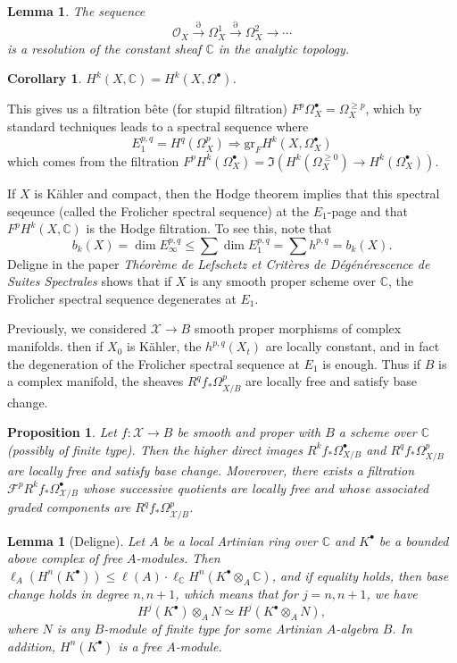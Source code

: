 \documentclass[leqno, openany]{memoir}
\newtheorem{cor}[thm]{Corollary}
\newtheorem{prop}[thm]{Proposition}
\newtheorem{lem}[thm]{Lemma}
\theoremstyle{definition}
\theoremstyle{remark}
\theoremstyle{plain}
\theoremstyle{definition}
\theoremstyle{remark}
\newcommand{\C}{\mathbb{C}}
\newcommand{\mc}[1]{\mathcal{#1}}
\newcommand{\mr}[1]{\mathrm{#1}}
\begin{document}
\begin{lem}
    The sequence
    \[ \mc{O}_X \xrightarrow{\partial} \Omega^1_{X} \xrightarrow{\partial} \Omega^2_X \to \cdots \]
    is a resolution of the constant sheaf $\C$ in the analytic topology.
\end{lem}

\begin{cor}
    $H^k(X, \C) = H^k(X, \Omega^{\bullet})$.
\end{cor}

This gives us a filtration b\^ete (for stupid filtration) $F^p \Omega^{\bullet}_X = \Omega_X^{\geq p}$, which by standard techniques leads to a spectral sequence where
\[ E_1^{p,q} = H^q(\Omega_X^p) \Rightarrow \mr{gr}_F H^k(X, \Omega^{\bullet}_X) \]
which comes from the filtration $F^p H^k(\Omega^{\bullet}_X) = \Im (H^k(\Omega_X^{\geq 0}) \to H^k(\Omega_X^{\bullet}))$.

If $X$ is K\"ahler and compact, then the Hodge theorem implies that this spectral seqeunce (called the Frolicher spectral sequence) at the $E_1$-page and that $F^p H^k(X, \C)$ is the Hodge filtration. To see this, note that
\[ b_k(X) = \dim E_{\infty}^{p,q} \leq \sum \dim E_{1}^{p,q} = \sum h^{p,q} = b_k(X). \]
Deligne in the paper \textit{Th\'eor\`eme de Lefschetz et Crit\`eres de D\'eg\'en\'erescence de Suites Spectrales}  shows that if $X$ is any smooth proper scheme over $\C$, the Frolicher spectral sequence degenerates at $E_1$.

Previously, we considered $\mc{X} \to B$ smooth proper morphisms of complex manifolds. then if $X_0$ is K\"ahler, the $h^{p,q}(X_t)$ are locally constant, and in fact the degeneration of the Frolicher spectral sequence at $E_1$ is enough. Thus if $B$ is a complex manifold, the sheaves $R^q f_* \Omega^p_{X/B}$ are locally free and satisfy base change.

\begin{prop}
    Let $f \colon \mc{X} \to B$ be smooth and proper with $B$ a scheme over $\C$ (possibly of finite type). Then the higher direct images $R^k f_* \Omega^{\bullet}_{X/B}$ and $R^q f_* \Omega^p_{X/B}$ are locally free and satisfy base change. Moverover, there exists a filtration $\mc{F}^p R^k f_* \Omega^{\bullet}_{\mc{X}/B}$ whose successive quotients are locally free and whose associated graded components are $R^q f_* \Omega^p_{\mc{X}/B}$.
\end{prop}

\begin{lem}[Deligne]
    Let $A$ be a local Artinian ring over $\C$ and $K^{\bullet}$ be a bounded above complex of free $A$-modules. Then $\ell_A(H^n(K^{\bullet})) \leq \ell(A) \cdot \ell_{\C} H^n(K^{\bullet} \otimes_A \C)$, and if equality holds, then base change holds in degree $n, n+1$, which means that for $j = n, n+1$, we have
    \[ H^j(K^{\bullet}) \otimes_A N \simeq H^j(K^{\bullet} \otimes_A N), \]
    where $N$ is any $B$-module of finite type for some Artinian $A$-algebra $B$. In addition, $H^n(K^{\bullet})$ is a free $A$-module.
\end{lem}
\end{document}
